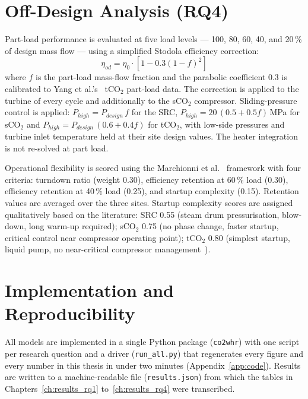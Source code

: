\documentclass[12pt,a4paper]{report}
\begin{document}
\section{Off-Design Analysis (RQ4)}
\label{sec:method_rq4}

Part-load performance is evaluated at five load levels --- 100, 80, 60, 40,
and 20\,\% of design mass flow --- using a simplified Stodola efficiency
correction:
\begin{equation}
\eta_{od} = \eta_0 \cdot [1 - 0.3(1-f)^2]
\label{eq:stodola}
\end{equation}
where $f$ is the part-load mass-flow fraction and the parabolic coefficient
$0.3$ is calibrated to Yang et al.'s~\cite{Yang2024} tCO$_2$ part-load data.
The correction is applied to the turbine of every cycle and additionally to
the sCO$_2$ compressor. Sliding-pressure control is applied: $P_{high} =
P_{design}\,f$ for the SRC, $P_{high} = 20\,(0.5 + 0.5f)$\,MPa for sCO$_2$
and $P_{high} = P_{design}\,(0.6 + 0.4f)$ for tCO$_2$, with low-side
pressures and turbine inlet temperature held at their site design values.
The heater integration is not re-solved at part load.

Operational flexibility is scored using the Marchionni et
al.~\cite{Marchionni2020} framework with four criteria: turndown ratio (weight
0.30), efficiency retention at 60\,\% load (0.30), efficiency retention at
40\,\% load (0.25), and startup complexity (0.15). Retention values are
averaged over the three sites. Startup complexity scores are assigned
qualitatively based on the literature: SRC 0.55 (steam drum pressurisation,
blow-down, long warm-up required); sCO$_2$ 0.75 (no phase change, faster
startup, critical control near compressor operating point); tCO$_2$ 0.80
(simplest startup, liquid pump, no near-critical compressor
management~\cite{Marchionni2020}).

\section{Implementation and Reproducibility}
\label{sec:method_code}

All models are implemented in a single Python package (\texttt{co2whr}) with
one script per research question and a driver (\texttt{run\_all.py}) that
regenerates every figure and every number in this thesis in under two minutes
(Appendix~\ref{app:code}). Results are written to a machine-readable file
(\texttt{results.json}) from which the tables in Chapters~\ref{ch:results_rq1}
to~\ref{ch:results_rq4} were transcribed.
\end{document}
